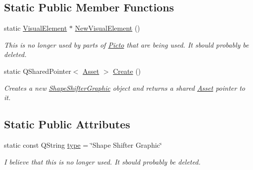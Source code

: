 \subsection*{Static Public Member Functions}
\begin{DoxyCompactItemize}
\item 
\hypertarget{class_picto_1_1_shape_shifter_graphic_ad269371f063fad474fe57fcb8c11f1bb}{static \hyperlink{struct_picto_1_1_visual_element}{Visual\-Element} $\ast$ \hyperlink{class_picto_1_1_shape_shifter_graphic_ad269371f063fad474fe57fcb8c11f1bb}{New\-Visual\-Element} ()}\label{class_picto_1_1_shape_shifter_graphic_ad269371f063fad474fe57fcb8c11f1bb}

\begin{DoxyCompactList}\small\item\em This is no longer used by parts of \hyperlink{namespace_picto}{Picto} that are being used. It sbould probably be deleted. \end{DoxyCompactList}\item 
\hypertarget{class_picto_1_1_shape_shifter_graphic_a66cce2ae6c76f6cb015ca03bc882d268}{static Q\-Shared\-Pointer$<$ \hyperlink{class_picto_1_1_asset}{Asset} $>$ \hyperlink{class_picto_1_1_shape_shifter_graphic_a66cce2ae6c76f6cb015ca03bc882d268}{Create} ()}\label{class_picto_1_1_shape_shifter_graphic_a66cce2ae6c76f6cb015ca03bc882d268}

\begin{DoxyCompactList}\small\item\em Creates a new \hyperlink{class_picto_1_1_shape_shifter_graphic}{Shape\-Shifter\-Graphic} object and returns a shared \hyperlink{class_picto_1_1_asset}{Asset} pointer to it. \end{DoxyCompactList}\end{DoxyCompactItemize}
\subsection*{Static Public Attributes}
\begin{DoxyCompactItemize}
\item 
\hypertarget{class_picto_1_1_shape_shifter_graphic_ae98c1fa76ca434eec118e124415e7883}{static const Q\-String \hyperlink{class_picto_1_1_shape_shifter_graphic_ae98c1fa76ca434eec118e124415e7883}{type} = \char`\"{}Shape Shifter Graphic\char`\"{}}\label{class_picto_1_1_shape_shifter_graphic_ae98c1fa76ca434eec118e124415e7883}

\begin{DoxyCompactList}\small\item\em I believe that this is no longer used. It sbould probably be deleted. \end{DoxyCompactList}\end{DoxyCompactItemize}
